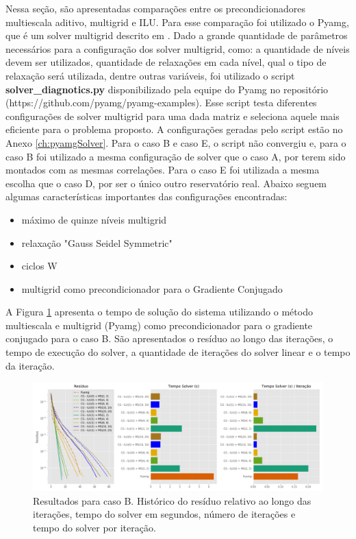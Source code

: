 Nessa seção, são apresentadas comparações entre os precondicionadores multiescala aditivo, multigrid e ILU. Para esse comparação foi utilizado o Pyamg, que é um solver multigrid  descrito em \citet{OlSc2018}. Dado a grande quantidade de parâmetros necessários para a configuração dos solver multigrid, como: a quantidade de níveis devem ser utilizados, quantidade de relaxações em cada nível, qual o tipo de relaxação será utilizada, dentre outras variáveis, foi utilizado o script \textbf{solver\_diagnotics.py} disponibilizado pela equipe do Pyamg no repositório (https://github.com/pyamg/pyamg-examples). Esse script testa diferentes configurações de solver multigrid para uma dada matriz e seleciona aquele mais eficiente para o problema proposto. A configurações geradas pelo script estão no Anexo \ref{ch:pyamgSolver}. Para o caso B e caso E, o script não convergiu e, para o caso B foi utilizado a mesma configuração de solver que o caso A, por terem sido montados com as mesmas correlações. Para o caso E foi utilizada a mesma escolha que o caso D, por ser o único outro reservatório real. Abaixo seguem algumas características importantes das configurações encontradas:

\begin{itemize}
    \item máximo de quinze níveis multigrid
    \item relaxação "Gauss Seidel Symmetric" 
    \item ciclos W
    \item multigrid como precondicionador para o Gradiente Conjugado
\end{itemize}


A Figura \ref{fig:reservatorio320x320_1} apresenta o tempo de solução do sistema utilizando o método multiescala e multigrid (Pyamg) como precondicionador para o gradiente conjugado para o caso B. São apresentados o resíduo ao longo das iterações, o tempo de execução do solver, a quantidade de iterações do solver linear e o tempo da iteração.

\begin{figure}[!htbp]
\centering
\includegraphics[width=\textwidth]{chap08/figs/reservatorio320x320_1.png}
\caption{Resultados para caso B. Histórico do resíduo relativo ao longo das iterações, tempo do solver em segundos, número de iterações e tempo do solver por iteração. }
\label{fig:reservatorio320x320_1} 
\end{figure}


